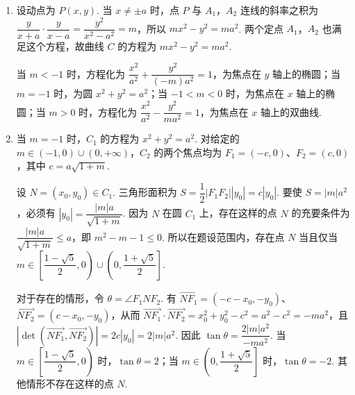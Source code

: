 \begin{solution}
\begin{enumerate}
\item 设动点为 \(P(x,y)\). 当 \(x\neq\pm a\) 时，点 \(P\) 与 \(A_1\)，\(A_2\) 连线的斜率之积为
\(\dfrac{y}{x+a}\cdot\dfrac{y}{x-a}=\dfrac{y^2}{x^2-a^2}=m\)，所以
\(mx^2-y^2=ma^2\). 两个定点 \(A_1\)，\(A_2\) 也满足这个方程，故曲线 \(C\) 的方程为
\(mx^2-y^2=ma^2\).

当 \(m<-1\) 时，方程化为 \(\dfrac{x^2}{a^2}+\dfrac{y^2}{(-m)a^2}=1\)，为焦点在 \(y\) 轴上的椭圆；当 \(m=-1\) 时，为圆 \(x^2+y^2=a^2\)；当 \(-1<m<0\) 时，为焦点在 \(x\) 轴上的椭圆；当 \(m>0\) 时，方程化为 \(\dfrac{x^2}{a^2}-\dfrac{y^2}{ma^2}=1\)，为焦点在 \(x\) 轴上的双曲线.
\item 当 \(m=-1\) 时，\(C_1\) 的方程为 \(x^2+y^2=a^2\). 对给定的 \(m\in(-1,0)\cup(0,+\infty)\)，\(C_2\) 的两个焦点均为
\(F_1=(-c,0)\)、\(F_2=(c,0)\)，其中 \(c=a\sqrt{1+m}\).

设 \(N=(x_0,y_0)\in C_1\). 三角形面积为
\(S=\dfrac12\left|F_1F_2\right|\left|y_0\right|=c\left|y_0\right|\). 要使 \(S=|m|a^2\)，必须有
\(\left|y_0\right|=\dfrac{|m|a}{\sqrt{1+m}}\). 因为 \(N\) 在圆 \(C_1\) 上，存在这样的点 \(N\) 的充要条件为
\(\dfrac{|m|a}{\sqrt{1+m}}\leqslant a\)，即
\(m^2-m-1\leqslant0\). 所以在题设范围内，存在点 \(N\) 当且仅当
\(m\in\left[\dfrac{1-\sqrt{5}}2,0\right)\cup\left(0,\dfrac{1+\sqrt{5}}2\right]\).

对于存在的情形，令 \(\theta=\angle F_1NF_2\). 有
\(\overrightarrow{NF_1}=(-c-x_0,-y_0)\)、\(\overrightarrow{NF_2}=(c-x_0,-y_0)\)，从而
\(\overrightarrow{NF_1}\cdot\overrightarrow{NF_2}=x_0^2+y_0^2-c^2=a^2-c^2=-ma^2\)，且
\(\left|\det\left(\overrightarrow{NF_1},\overrightarrow{NF_2}\right)\right|=2c|y_0|=2|m|a^2\). 因此
\(\tan\theta=\dfrac{2|m|a^2}{-ma^2}\). 当 \(m\in\left[\dfrac{1-\sqrt{5}}2,0\right)\) 时，\(\tan\theta=2\)；当 \(m\in\left(0,\dfrac{1+\sqrt{5}}2\right]\) 时，\(\tan\theta=-2\). 其他情形不存在这样的点 \(N\).
\end{enumerate}
\end{solution}
